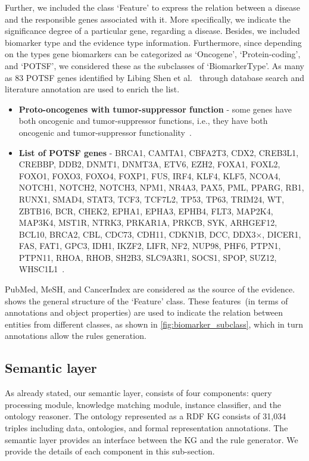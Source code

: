 \hspace*{3.5mm} Further, we included the class `Feature' to express the relation between a disease and the responsible genes associated with it. More specifically, we indicate the significance degree of a particular gene, regarding a disease. Besides, we included biomarker type and the evidence type information. Furthermore, since depending on the types gene biomarkers can be categorized as `Oncogene', `Protein-coding', and `POTSF', we considered these as the subclasses of `BiomarkerType'. As many as 83 POTSF genes identified by Libing Shen et al.~\cite{POSTF} through database search and literature annotation are used to enrich the list. 

\begin{itemize}[noitemsep]
    \item \textbf{Proto-oncogenes with tumor-suppressor function} - some genes have both oncogenic and tumor-suppressor functions, i.e., they have both oncogenic and tumor-suppressor functionality~\cite{POSTF}.
    \item \textbf{List of POTSF genes} - BRCA1, CAMTA1, CBFA2T3, CDX2, CREB3L1, CREBBP, DDB2, DNMT1, DNMT3A, ETV6, EZH2, FOXA1, FOXL2, FOXO1, FOXO3, FOXO4, FOXP1, FUS, IRF4, KLF4, KLF5, NCOA4, NOTCH1, NOTCH2, NOTCH3, NPM1, NR4A3, PAX5, PML, PPARG, RB1, RUNX1, SMAD4, STAT3, TCF3, TCF7L2, TP53, TP63, TRIM24, WT, ZBTB16, BCR, CHEK2, EPHA1, EPHA3, EPHB4, FLT3, MAP2K4, MAP3K4, MST1R, NTRK3, PRKAR1A, PRKCB, SYK, ARHGEF12, BCL10, BRCA2, CBL, CDC73, CDH11, CDKN1B, DCC, DDX3×, DICER1, FAS, FAT1, GPC3, IDH1, IKZF2, LIFR, NF2, NUP98, PHF6, PTPN1, PTPN11, RHOA, RHOB, SH2B3, SLC9A3R1, SOCS1, SPOP, SUZ12, WHSC1L1~\cite{POSTF}. 
\end{itemize}

\hspace*{3.5mm} PubMed, MeSH, and CancerIndex are considered as the source of the evidence.  shows the general structure of the `Feature' class. These features~(in terms of annotations and object properties) are used to indicate the relation between entities from different classes, as shown in \cref{fig:biomarker_subclass}, which in turn annotations allow the rules generation. 

\subsection{Semantic layer}
As already stated, our semantic layer, consists of four components: query processing module, knowledge matching module, instance classifier, and the ontology reasoner. The ontology represented as a RDF KG consists of 31,034 triples including data, ontologies, and formal representation annotations. The semantic layer provides an interface between the KG and the rule generator. We provide the details of each component in this sub-section.

